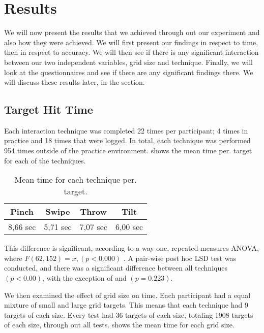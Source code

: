 \section{Results}
We will now present the results that we achieved through out our experiment and also how they were achieved. We will first present our findings in respect to time, then in respect to accuracy. We will then see if there is any significant interaction between our two independent variables, grid size and technique. Finally, we will look at the questionnaires and see if there are any significant findings there. We will discuss these results later, in the  section.  

\subsection{Target Hit Time}

Each interaction technique was completed 22 times per participant; 4 times in practice and 18 times that were logged. In total, each technique was performed 954 times outside of the practice environment.  shows the mean time per. target for each of the techniques. 
\begin{table}[H]
	\centering
	\begin{tabular}{|c|c|c|c|}
		\hline
		\rowcolor[HTML]{9B9B9B} 
		\textbf{Pinch} & \textbf{Swipe} & \textbf{Throw} & \textbf{Tilt} \\ \hline
		8,66  sec         & 5,71 sec          & 7,07 sec          & 6,00 sec         \\ \hline
	\end{tabular}
	\caption{Mean time for each technique per. target.}
	\label{tab:meanTimesTechnique}
\end{table}

This difference is significant, according to a way one, repeated measures ANOVA, where $F(62,152) = x, (p<0.000)$ . A pair-wise post hoc LSD test was conducted, and there was a significant difference between all techniques $(p<0.00)$, with the exception of \swipe and \tilt $(p=0.223)$. 

We then examined the effect of grid size on time. Each participant had a equal mixture of small and large grid targets. This means that each technique had 9 targets of each size. Every test had 36 targets of each size, totaling 1908 targets of each size, through out all tests.  shows the mean time for each grid size. 

